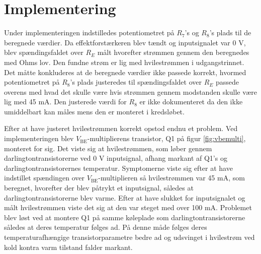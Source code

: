 \section{Implementering}
\label{effektforstaerker_implementering}

Under implementeringen indstilledes potentiometret på $R_7$'s og $R_8$'s plads til de beregnede værdier. Da effektforstærkeren blev tændt og inputsignalet var 0 V, blev spændingsfaldet over $R_E$ målt hvorefter strømmen gennem den beregnedes med Ohms lov. Den fundne strøm er lig med hvilestrømmen i udgangstrinnet. Det måtte konkluderes at de beregnede værdier ikke passede korrekt, hvormed potentiometret på $R_8$'s plads justeredes til spændingsfaldet over $R_E$ passede overens med hvad det skulle være hvis strømmen gennem modstanden skulle være lig med 45 mA. Den justerede værdi for $R_8$ er ikke dokumenteret da den ikke umiddelbart kan måles mens den er monteret i kredsløbet.

Efter at have justeret hvilestrømmen korrekt opstod endnu et problem. Ved implementeringen blev $V_\mathrm{BE}$-multiplierens transistor, Q1 på figur \ref{fig:vbemulti}, monteret for sig. Det viste sig at hvilestrømmen, som løber gennem darlingtontransistorerne ved 0 V inputsignal, afhang markant af Q1's og darlingtontransistorernes temperatur. Symptomerne viste sig efter at have indstillet spændingen over $V_\mathrm{BE}$-multiplieren så hvilestrømmen var 45 mA, som beregnet, hvorefter der blev påtrykt et inputsignal, således at darlingtontransistorerne blev varme. Efter at have slukket for inputsignalet og målt hvilestrømmen viste det sig at den var steget med over 100 mA. Problemet blev løst ved at montere Q1 på samme køleplade som darlingtontransistorerne således at deres temperatur følges ad. På denne måde følges deres temperaturafhængige transistorparametre bedre ad og udsvinget i hvilestrøm ved kold kontra varm tilstand falder markant. 